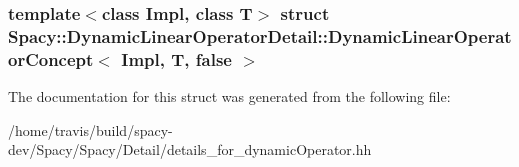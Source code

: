 \subsubsection*{template$<$class Impl, class T$>$ struct Spacy\-::\-Dynamic\-Linear\-Operator\-Detail\-::\-Dynamic\-Linear\-Operator\-Concept$<$ Impl, T, false $>$}



\-The documentation for this struct was generated from the following file\-:\begin{DoxyCompactItemize}
\item 
/home/travis/build/spacy-\/dev/\-Spacy/\-Spacy/\-Detail/details\-\_\-for\-\_\-dynamic\-Operator.\-hh\end{DoxyCompactItemize}
